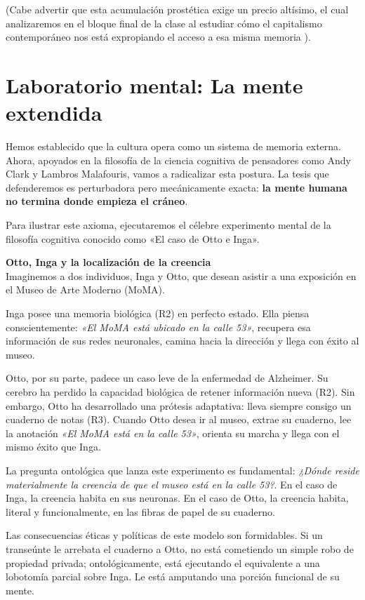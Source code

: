 (Cabe advertir que esta acumulación prostética exige un precio altísimo, el cual analizaremos en el bloque final de la clase al estudiar cómo el capitalismo contemporáneo nos está expropiando el acceso a esa misma memoria ).

\section{Laboratorio mental: La mente extendida}

Hemos establecido que la cultura opera como un sistema de memoria externa. Ahora, apoyados en la filosofía de la ciencia cognitiva de pensadores como Andy Clark y Lambros Malafouris, vamos a radicalizar esta postura. La tesis que defenderemos es perturbadora pero mecánicamente exacta: \textbf{la mente humana no termina donde empieza el cráneo}. 

Para ilustrar este axioma, ejecutaremos el célebre experimento mental de la filosofía cognitiva conocido como «El caso de Otto e Inga».

\begin{ejemplo}
\textbf{Otto, Inga y la localización de la creencia}\\
Imaginemos a dos individuos, Inga y Otto, que desean asistir a una exposición en el Museo de Arte Moderno (MoMA).

Inga posee una memoria biológica (R2) en perfecto estado. Ella piensa conscientemente: \textit{«El MoMA está ubicado en la calle 53»}, recupera esa información de sus redes neuronales, camina hacia la dirección y llega con éxito al museo.

Otto, por su parte, padece un caso leve de la enfermedad de Alzheimer. Su cerebro ha perdido la capacidad biológica de retener información nueva (R2). Sin embargo, Otto ha desarrollado una prótesis adaptativa: lleva siempre consigo un cuaderno de notas (R3). Cuando Otto desea ir al museo, extrae su cuaderno, lee la anotación \textit{«El MoMA está en la calle 53»}, orienta su marcha y llega con el mismo éxito que Inga.

La pregunta ontológica que lanza este experimento es fundamental: \textit{¿Dónde reside materialmente la creencia de que el museo está en la calle 53?}. En el caso de Inga, la creencia habita en sus neuronas. En el caso de Otto, la creencia habita, literal y funcionalmente, en las fibras de papel de su cuaderno. 
\end{ejemplo}

Las consecuencias éticas y políticas de este modelo son formidables. Si un transeúnte le arrebata el cuaderno a Otto, no está cometiendo un simple robo de propiedad privada; ontológicamente, está ejecutando el equivalente a una lobotomía parcial sobre Inga. Le está amputando una porción funcional de su mente.

